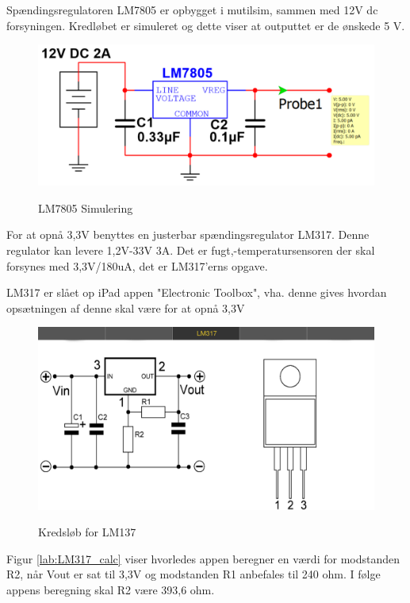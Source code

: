 Spændingsregulatoren LM7805 er opbygget i mutilsim, sammen med 12V dc forsyningen. Kredløbet er simuleret og dette viser at outputtet er de ønskede 5 V.

\begin{figure}[H] \centering
{\includegraphics[width=\textwidth]{filer/design/Billeder/LM7805_SIMULATION}}
\caption{LM7805 Simulering}
\label{lab:LM7805_SIMULERING}
\raggedright
\end{figure}


For at opnå 3,3V benyttes en justerbar spændingsregulator LM317. Denne regulator kan levere 1,2V-33V 3A. Det er fugt,-temperatursensoren der skal forsynes med 3,3V/180uA, det er LM317'erns opgave. 

LM317 er slået op iPad appen "Electronic Toolbox", vha. denne gives hvordan opsætningen af denne skal være for at opnå 3,3V 
 
\begin{figure}[H] \centering
{\includegraphics[width=\textwidth]{filer/design/Billeder/LM317}}
\caption{Kredsløb for LM137}
\label{lab:LM317}
\raggedright
\end{figure}

Figur \ref{lab:LM317_calc} viser hvorledes appen beregner en værdi for modstanden R2, når Vout er sat til 3,3V og modstanden R1 anbefales til 240 ohm. I følge appens beregning skal R2 være 393,6 ohm.


